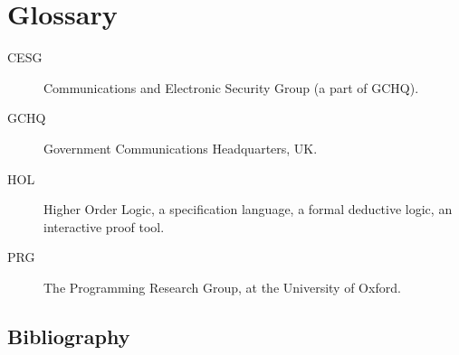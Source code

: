 \documentclass[10pt,titlepage]{book}
\begin{document}
\chapter{Glossary}

\begin{description}
\item[CESG] Communications and Electronic Security Group (a part of GCHQ).
\item[GCHQ] Government Communications Headquarters, UK.
\item[HOL] Higher Order Logic, a specification language, a formal deductive logic, an interactive proof tool.
\item[PRG] The Programming Research Group, at the University of Oxford.
\end{description}


\backmatter
\section*{Bibliography}\label{bibliography}



\end{document}
